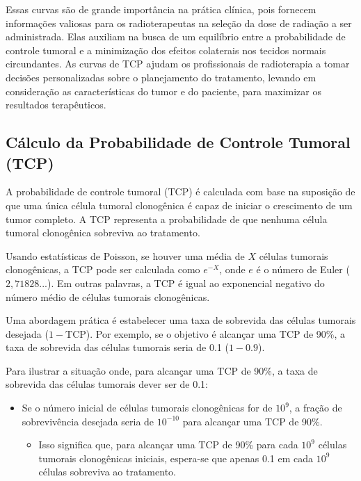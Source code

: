 \documentclass[11pt,a4paper]{article}
\newcounter{exemplo}
\begin{document}
	Essas curvas são de grande importância na prática clínica, pois fornecem informações valiosas para os radioterapeutas na seleção da dose de radiação a ser administrada. Elas auxiliam na busca de um equilíbrio entre a probabilidade de controle tumoral e a minimização dos efeitos colaterais nos tecidos normais circundantes. As curvas de TCP ajudam os profissionais de radioterapia a tomar decisões personalizadas sobre o planejamento do tratamento, levando em consideração as características do tumor e do paciente, para maximizar os resultados terapêuticos.

\subsection*{Cálculo da Probabilidade de Controle Tumoral (TCP)}

	A probabilidade de controle tumoral (TCP) é calculada com base na suposição de que uma única célula tumoral clonogênica é capaz de iniciar o crescimento de um tumor completo. A TCP representa a probabilidade de que nenhuma célula tumoral clonogênica sobreviva ao tratamento.

	Usando estatísticas de Poisson, se houver uma média de $X$ células tumorais clonogênicas, a TCP pode ser calculada como $e^{-X}$, onde $e$ é o número de Euler ($2,71828...$). Em outras palavras, a TCP é igual ao exponencial negativo do número médio de células tumorais clonogênicas.

	Uma abordagem prática é estabelecer uma taxa de sobrevida das células tumorais desejada ($1 - \text{TCP}$). Por exemplo, se o objetivo é alcançar uma TCP de 90\%, a taxa de sobrevida das células tumorais seria de 0.1 ($1 - 0.9$).

	\begin{tcolorbox}[width=\textwidth, colback={white}, colbacktitle={DarkTurquoise!50!white}, title={$\bigstar$ \LobsterTwo{Para Entender Melhor} $\bigstar$}, coltitle={CarnationPink}, colframe={DarkTurquoise}, fonttitle=\rmfamily\bfseries\Large, breakable]

		Para ilustrar a situação onde, para  alcançar uma TCP de 90\%, a taxa de sobrevida das células tumorais dever ser de 0.1:
		
		\begin{itemize}[label=\textcolor{CarnationPink}{$\blacktriangleright$}]
			\item Se o número inicial de células tumorais clonogênicas for de $10^9$, a fração de sobrevivência desejada seria de $10^{-10}$ para alcançar uma TCP de 90\%. 
				\begin{itemize}[label=\textcolor{CarnationPink}{$\star$}]
					\item Isso significa que, para alcançar uma TCP de 90\% para cada $10^9$ células tumorais clonogênicas iniciais, espera-se que apenas 0.1 em cada $10^{9}$ células sobreviva ao tratamento.
				\end{itemize}
			\end{itemize}
	\end{tcolorbox}
\end{document}

